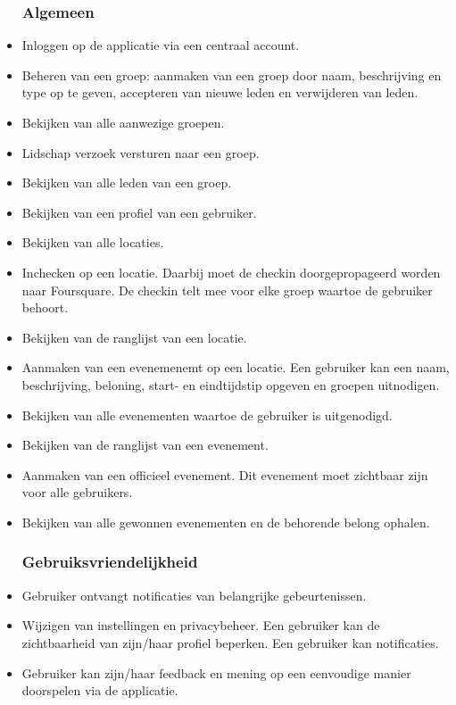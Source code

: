 \begin{itemize}
	
\subsubsection{Algemeen}
\item Inloggen op de applicatie via een centraal account.

\item Beheren van een groep: aanmaken van een groep door naam, beschrijving en type op te geven, accepteren van nieuwe leden en verwijderen van leden.   

\item Bekijken van alle aanwezige groepen.

\item Lidschap verzoek versturen naar een groep.

\item Bekijken van alle leden van een groep.

\item Bekijken van een profiel van een gebruiker.

\item Bekijken van alle locaties.

\item Inchecken op een locatie. Daarbij moet de checkin doorgepropageerd worden naar Foursquare. De checkin telt mee voor elke groep waartoe de gebruiker behoort. 

\item Bekijken van de ranglijst van een locatie.

\item Aanmaken van een evenemenemt op een locatie. Een gebruiker kan een naam, beschrijving, beloning, start- en eindtijdstip opgeven en groepen uitnodigen.

\item Bekijken van alle evenementen waartoe de gebruiker is uitgenodigd.

\item Bekijken van de ranglijst van een evenement.

\item Aanmaken van een officieel evenement. Dit evenement moet zichtbaar zijn voor alle gebruikers.

\item Bekijken van alle gewonnen evenementen en de behorende belong ophalen.

\subsubsection{Gebruiksvriendelijkheid}

\item Gebruiker ontvangt notificaties van belangrijke gebeurtenissen.

\item Wijzigen van instellingen en privacybeheer. Een gebruiker kan de zichtbaarheid van zijn/haar profiel beperken. Een gebruiker kan notificaties.

\item Gebruiker kan zijn/haar feedback en mening op een eenvoudige manier doorspelen via de applicatie.

\end{itemize}
